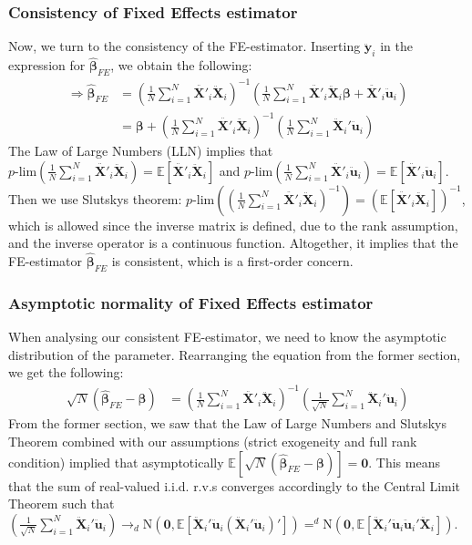 \subsubsection*{Consistency of Fixed Effects estimator}
Now, we turn to the consistency of the FE-estimator. Inserting $\pmb{\ddot{y}}_i$ in the expression for $\pmb{\hat{\beta}}_{FE}$, we obtain the following:
\begin{align*}
    \Rightarrow \pmb{\hat{\beta}}_{FE} &= \left( \frac{1}{N} \sum_{i=1}^N {\pmb{\ddot{X'}}_{i} \pmb{\ddot{X}}_{i} } \right) ^{-1} \left(\frac{1}{N} \sum_{i=1}^N {\pmb{\ddot{X'}}_{i}}\pmb{\ddot{X}}_{i} \pmb{\beta}+\pmb{\ddot{X'}}_{i}\pmb{\ddot{u}}_i \right) \\
    &= \pmb{\beta} +\left( \frac{1}{N} \sum_{i=1}^N {\pmb{\ddot{X'}}_{i} \pmb{\ddot{X}}_{i} } \right) ^{-1} \left( \frac{1}{N} \sum_{i=1}^N {\pmb{\ddot{X}}_i' \pmb{\ddot{u}}_i} \right)
\end{align*}
The Law of Large Numbers (LLN) implies that $p\text{-lim}\left(\frac{1}{N} \sum_{i=1}^N {\pmb{\ddot{X'}}_{i} \pmb{\ddot{X}}_{i} } \right)=\mathbb{E}[\pmb{\ddot{X'}}_{i} \pmb{\ddot{X}}_{i}]$ and $p\text{-lim}\left(\frac{1}{N} \sum_{i=1}^N {\pmb{\ddot{X'}}_{i} \pmb{\ddot{u}}_{i} } \right)=\mathbb{E}[\pmb{\ddot{X'}}_{i} \pmb{\ddot{u}}_{i}]$. Then we use Slutskys theorem: $p\text{-lim}\left( \left(\frac{1}{N} \sum_{i=1}^N {\pmb{\ddot{X'}}_{i} \pmb{\ddot{X}}_{i} } \right)^{-1}\right)=(\mathbb{E}[\pmb{\ddot{X'}}_{i} \pmb{\ddot{X}}_{i}])^{-1}$, which is allowed since the inverse matrix is defined, due to the rank assumption, and the inverse operator is a continuous function. Altogether, it implies that the FE-estimator $\pmb{\hat{\beta}}_{FE}$ is consistent, which is a first-order concern.

\subsubsection{Asymptotic normality of Fixed Effects estimator}
When analysing our consistent FE-estimator, we need to know the asymptotic distribution of the parameter. Rearranging the equation from the former section, we get the following:
\begin{align*}
    \sqrt{N}(\pmb{\hat{\beta}}_{FE}-\pmb{\beta})&=  \left( \frac{1}{N} \sum_{i=1}^N {\pmb{\ddot{X'}}_{i} \pmb{\ddot{X}}_{i} } \right) ^{-1} \left( \frac{1}{\sqrt{N}} \sum_{i=1}^N {\pmb{\ddot{X}}_i' \pmb{\ddot{u}}_i} \right)
\end{align*}
From the former section, we saw that the Law of Large Numbers and Slutskys Theorem combined with our assumptions (strict exogeneity and full rank condition) implied that asymptotically $\mathbb{E}[\sqrt{N}(\pmb{\hat{\beta}}_{FE}-\pmb{\beta})]=\pmb{0}$. This means that the sum of real-valued i.i.d. r.v.s converges accordingly to the Central Limit Theorem such that $\left( \frac{1}{\sqrt{N}} \sum_{i=1}^N {\pmb{\ddot{X}}_i' \pmb{\ddot{u}}_i} \right)\rightarrow _d \text{N}(\pmb{0},\mathbb{E}[\pmb{\ddot{X}}_i' \pmb{\ddot{u}}_i(\pmb{\ddot{X}}_i' \pmb{\ddot{u}}_i)'])=^d \text{N}(\pmb{0},\mathbb{E}[\pmb{\ddot{X}}_i' \pmb{\ddot{u}}_i\pmb{\ddot{u}}_i'\pmb{\ddot{X}}_i])$.

